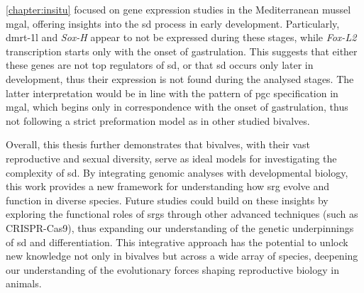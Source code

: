 \cref{chapter:insitu} focused on gene expression studies in the Mediterranean mussel \gls{mgal}, offering insights into the \gls{sd} process in early development. Particularly, \gls{dmrt-1l} and \textit{Sox-H} appear to not be expressed during these stages, while \textit{Fox-L2} transcription starts only with the onset of gastrulation. This suggests that either these genes are not top regulators of \gls{sd}, or that \gls{sd} occurs only later in development, thus their expression is not found during the analysed stages. The latter interpretation would be in line with the pattern of \gls{pgc} specification in \gls{mgal}, which begins only in correspondence with the onset of gastrulation, thus not following a strict preformation model as in other studied bivalves.

Overall, this thesis further demonstrates that bivalves, with their vast reproductive and sexual diversity, serve as ideal models for investigating the complexity of \gls{sd}. By integrating genomic analyses with developmental biology, this work provides a new framework for understanding how \gls{srg} evolve and function in diverse species. Future studies could build on these insights by exploring the functional roles of \glspl{srg} through other advanced techniques (such as CRISPR-Cas9), thus expanding our understanding of the genetic underpinnings of \gls{sd} and differentiation. This integrative approach has the potential to unlock new knowledge not only in bivalves but across a wide array of species, deepening our understanding of the evolutionary forces shaping reproductive biology in animals.

